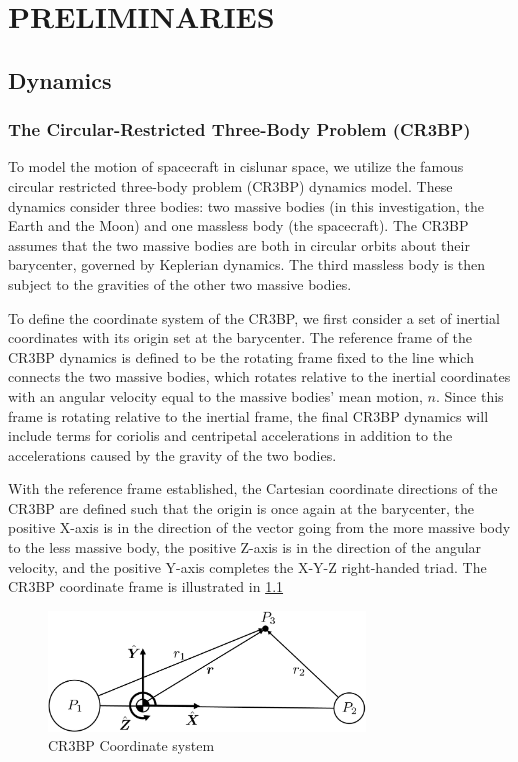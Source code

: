 
\chapter{PRELIMINARIES}

\section{Dynamics}
\subsection{The Circular-Restricted Three-Body Problem (CR3BP)}

To model the motion of spacecraft in cislunar space, we utilize the famous circular restricted three-body problem (CR3BP) dynamics model. These dynamics consider three bodies: two massive bodies (in this investigation, the Earth and the Moon) and one massless body (the spacecraft). The CR3BP assumes that the two massive bodies are both in circular orbits about their barycenter, governed by Keplerian dynamics. The third massless body is then subject to the gravities of the other two massive bodies. 

To define the coordinate system of the CR3BP, we first consider a set of inertial coordinates with its origin set at the barycenter. The reference frame of the CR3BP dynamics is defined to be the rotating frame fixed to the line which connects the two massive bodies, which rotates relative to the inertial coordinates with an angular velocity equal to the massive bodies' mean motion, $n$. Since this frame is rotating relative to the inertial frame, the final CR3BP dynamics will include terms for coriolis and centripetal accelerations in addition to the accelerations caused by the gravity of the two bodies.

With the reference frame established, the Cartesian coordinate directions of the CR3BP are defined such that the origin is once again at the barycenter, the positive X-axis is in the direction of the vector going from the more massive body to the less massive body, the positive Z-axis is in the direction of the angular velocity, and the positive Y-axis completes the X-Y-Z right-handed triad. The CR3BP coordinate frame is illustrated in \cref{fig:CR3BP}

\begin{figure}
    \begin{center}
    \includegraphics[width=0.75\textwidth]{graphics/cr3bp.png}
    \end{center}
    \caption{CR3BP Coordinate system}
    \label{fig:CR3BP}
\end{figure}

